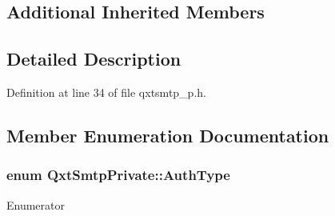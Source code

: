 \subsection*{Additional Inherited Members}


\subsection{Detailed Description}


Definition at line 34 of file qxtsmtp\-\_\-p.\-h.



\subsection{Member Enumeration Documentation}
\hypertarget{class_qxt_smtp_private_a61d8923026f0f75d0132d1bd42f4f4bc}{
\subsubsection[{Auth\-Type}]{\setlength{\rightskip}{0pt plus 5cm}enum {\bf Qxt\-Smtp\-Private\-::\-Auth\-Type}}}\label{class_qxt_smtp_private_a61d8923026f0f75d0132d1bd42f4f4bc}
\begin{Desc}
\item[Enumerator]\par
\begin{description}
\item[{\em 
\hypertarget{class_qxt_smtp_private_a61d8923026f0f75d0132d1bd42f4f4bca6943de1b8087ba0b84c2c0eb79e680e7}{Auth\-Plain}\label{class_qxt_smtp_private_a61d8923026f0f75d0132d1bd42f4f4bca6943de1b8087ba0b84c2c0eb79e680e7}
}]\item[{\em 
\hypertarget{class_qxt_smtp_private_a61d8923026f0f75d0132d1bd42f4f4bca7a1e7627de0864b663593513b68ce469}{Auth\-Login}\label{class_qxt_smtp_private_a61d8923026f0f75d0132d1bd42f4f4bca7a1e7627de0864b663593513b68ce469}
}]\item[{\em 
\hypertarget{class_qxt_smtp_private_a61d8923026f0f75d0132d1bd42f4f4bcaac6070a05b6dfd41f37d2f29bbd38853}{Auth\-Cram\-M\-D5}\label{class_qxt_smtp_private_a61d8923026f0f75d0132d1bd42f4f4bcaac6070a05b6dfd41f37d2f29bbd38853}
}]\end{description}
\end{Desc}


